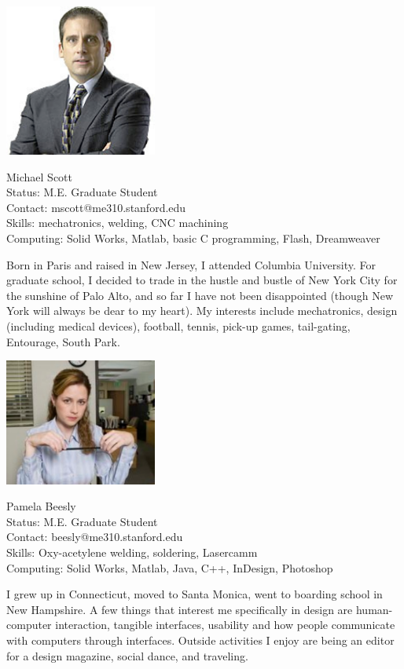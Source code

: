 \begin{framed}
\noindent \includegraphics[width=50mm]{Figures/Ch2/Scott}
\parbox[b]{0.6\textwidth}{Michael Scott\\
Status: M.E. Graduate Student\\
Contact: mscott@me310.stanford.edu\\
Skills: mechatronics, welding, CNC machining\\
Computing: Solid Works, Matlab, basic C programming, Flash, Dreamweaver\\
}

Born in Paris and raised in New Jersey, I attended Columbia University. For graduate school, I decided to trade in the hustle and bustle of New York City for the sunshine of Palo Alto, and so far I have not been disappointed (though New York will always be dear to my heart). My interests include mechatronics, design (including medical devices), football, tennis, pick-up games, tail-gating, Entourage, South Park.
\end{framed}

\begin{framed}
\noindent \includegraphics[width=50mm]{Figures/Ch2/PamBeesly}
\parbox[b]{0.6\textwidth}{Pamela Beesly\\
Status: M.E. Graduate Student\\
Contact: beesly@me310.stanford.edu\\
Skills: Oxy-acetylene welding, soldering, Lasercamm\\
Computing: Solid Works, Matlab, Java, C++, InDesign, Photoshop\\
}

I grew up in Connecticut, moved to Santa Monica, went to boarding school in New Hampshire. A few things that interest me specifically in design are human-computer interaction, tangible interfaces, usability and how people communicate with computers through interfaces. Outside activities I enjoy are being an editor for a design magazine, social dance, and traveling.
\end{framed}

